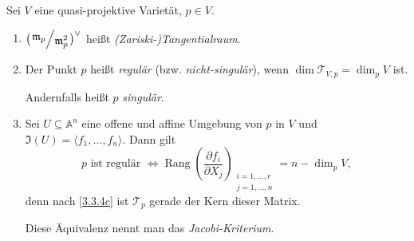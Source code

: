 \documentclass[a4paper,12pt,index=toc]{scrbook}
\theoremstyle{keinenummern} %
\def\A{\mathbb{A}}
\def\I{\mathfrak{I}}
\def\T{\mathcal{T}}
\def\m{\mathfrak{m}}
\newcommand{\Rang}{\operatorname{Rang}}
\let\olddotsc\dotsc %
\renewcommand{\dotsc}{\ensuremath{\!...}}
\begin{document}
\begin{db}\label{3.3.10}
Sei $V$ eine quasi-projektive Varietät, $p\in V$.
\begin{enumerate}
\item{} $\displaystyle \bigl(\Quotient{\m_{p}}{\m_{p}^{2}}\bigr)^{\vee}$ heißt \emph{(Zariski-)Tangentialraum}.
\item{} Der Punkt $p$ heißt \emph{regulär} (bzw. \emph{nicht-singulär}), wenn $\dim\T_{V,p}=\dim_{p} V$ ist.

Andernfalls heißt $p$ \emph{singulär}.
\item{} Sei $U\subseteq\A^{n}$ eine offene und affine Umgebung von $p$ in $V$ und $\I(U)=\langle f_{1},\dotsc,f_{n}\rangle$. Dann gilt
\[p\text{ ist regulär }\iff \Rang\left(\frac{\partial f_{i}}{\partial X_{j}}\right)_{\substack{i=1,\olddotsc,r\\ j=1,\olddotsc,n}}=n-\dim_{p}V,\]
denn nach \cref{3.3.4c} ist $\T_{p}$ gerade der Kern dieser Matrix.

Diese Äquivalenz nennt man das \emph{Jacobi-Kriterium}.
\end{enumerate}\end{db}
\end{document}
